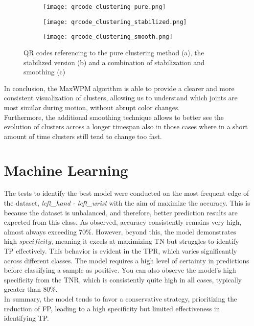 \begin{figure}[H]
  \centering
  \begin{subfigure}[b]{0.49\textwidth}
    \centering
    \texttt{[image: qrcode\_clustering\_pure.png]}
    \caption{}
    \label{fig:qr_movement_pure}
  \end{subfigure}
  \hfill
  \begin{subfigure}[b]{0.49\textwidth}
    \centering
    \texttt{[image: qrcode\_clustering\_stabilized.png]}
    \caption{}
    \label{fig:qr_movement_stabilized}
  \end{subfigure}
  \hfill
  \begin{subfigure}[b]{0.49\textwidth}
    \centering
    \texttt{[image: qrcode\_clustering\_smooth.png]}
    \caption{}
    \label{fig:qr_movement_smooth}
  \end{subfigure}
  \caption{QR codes referencing to the pure clustering method (a), the stabilized version (b) and a combination of stabilization and smoothing (c)}
  \label{fig:qr_movements}
\end{figure}


In conclusion, the MaxWPM algorithm is able to provide a clearer and more consistent visualization of clusters, allowing us to understand which joints are most similar during motion, without abrupt color changes. \\
Furthermore, the additional smoothing technique allows to better see the evolution of clusters across a longer timespan also in those cases where in a short amount of time clusters still tend to change too fast.\\



\clearpage

\section{Machine Learning}

The tests to identify the best model were conducted on the most frequent edge of the dataset, \textit{left\_hand - left\_wrist} with the aim of maximize the accuracy.
This is because the dataset is unbalanced, and therefore, better prediction results are expected from this class.
As observed, accuracy consistently remains very high, almost always exceeding 70\%.
However, beyond this, the model demonstrates high $specificity$, meaning it excels at maximizing TN but struggles to identify TP effectively.
This behavior is evident in the TPR, which varies significantly across different classes.
The model requires a high level of certainty in predictions before classifying a sample as positive.
You can also observe the model's high specificity from the TNR, which is consistently quite high in all cases, typically greater than 80\%. \\
In summary, the model tends to favor a conservative strategy, prioritizing the reduction of FP, leading to a high specificity but limited effectiveness in identifying TP.

